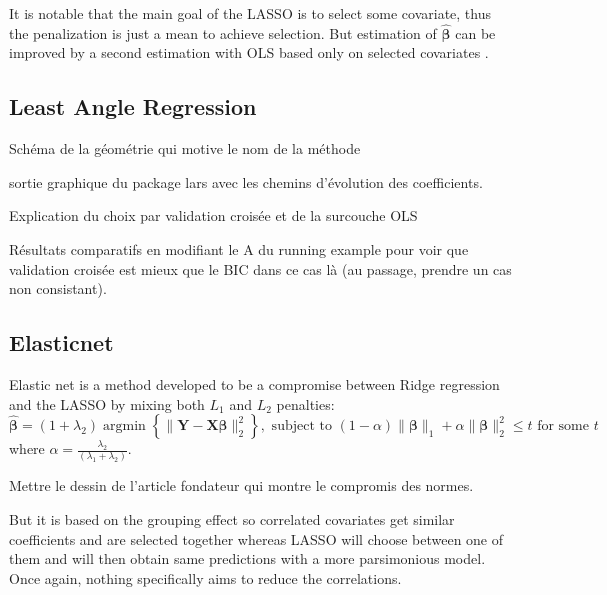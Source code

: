 \documentclass[12pt,a4paper]{report}
\begin{document}
			 It is notable that the main goal of the LASSO is to select some covariate, thus the penalization is just a mean to achieve selection. But estimation of $\hat{\boldsymbol{\beta}}$ can be improved by a second estimation with OLS based only on selected covariates \cite{SAM10088}.
		\subsection{Least Angle Regression}
			Schéma de la géométrie qui motive le nom de la méthode
			
			sortie graphique du package lars avec les chemins d'évolution des coefficients.
			
			Explication du choix par validation croisée et de la surcouche OLS
			
			Résultats comparatifs en modifiant le A du running example pour voir que validation croisée est mieux que le BIC dans ce cas là (au passage, prendre un cas non consistant).	 
			 
		\subsection{Elasticnet}		%

			Elastic net \cite{zou2005regularization} is a method developed to be a compromise between Ridge regression and the \textsc{LASSO} by mixing both $L_1$ and $L_2$ penalties: 
	\begin{equation}
		\boldsymbol{\hat{\beta}}=(1+\lambda_2) \operatorname{argmin}\left\lbrace \parallel \boldsymbol{Y}-\boldsymbol{X\beta} \parallel_2^2 \right\rbrace, \textrm{ subject to } (1-\alpha)\parallel\boldsymbol{\beta}\parallel_1+\alpha\parallel\boldsymbol{\beta}\parallel_2^2\leq t \textrm{ for some } t
	\end{equation}
	where $\alpha=\frac{\lambda_2}{(\lambda_1+\lambda_2)}$. 
	
	
Mettre le dessin de l'article fondateur qui montre le compromis des normes.	
	
	
	But it is based on the grouping effect so correlated covariates get similar coefficients and are selected together whereas LASSO will choose between one of them and will then obtain same predictions with a more parsimonious model. Once again, nothing specifically aims to reduce the correlations. %
\end{document}
